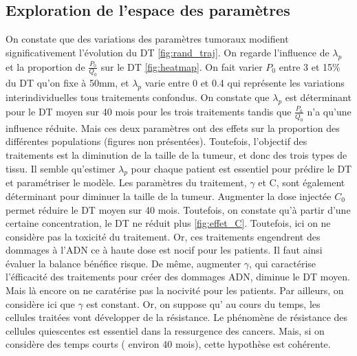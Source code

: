 \documentclass[12pt,a4paper]{article}
\begin{document}
\subsection{Exploration de l'espace des paramètres}
On constate que des variations des paramètres tumoraux modifient significativement l'évolution du DT \ref{fig:rand_traj}.  On regarde l'influence de $\lambda_{p}$ et  la proportion de $\frac{P_{0}}{Q_{0}}$
sur le DT \ref{fig:heatmap}. On fait varier $P_{0}$ entre 3 et 15\% du DT qu'on fixe à 50mm, et $\lambda_{p}$ varie entre 0 et 0.4 qui représente les variations interindividuelles tous traitements confondus. On constate que $\lambda_{p}$ est déterminant pour le DT moyen sur 40 mois pour les trois traitements tandis que $\frac{P_{0}}{Q_{0}}$ n'a qu'une influence réduite. Mais ces deux paramètres ont des effets sur la proportion des différentes populations (figures non présentées). Toutefois, l'objectif des traitements est la diminution de la taille de la tumeur, et donc des trois types de tissu. Il semble qu'estimer $\lambda_{p}$ pour chaque patient est essentiel pour prédire le DT et paramétriser le modèle. Les paramètres du traitement,  $\gamma$ et C, sont également déterminant pour diminuer la taille de la tumeur. Augmenter la dose injectée $C_{0}$ permet réduire le DT moyen sur 40 mois. Toutefois, on constate qu'à partir d'une certaine concentration, le DT ne réduit plus \ref{fig:effet_C}. Toutefois, ici on ne considère pas la toxicité du traitement.  Or, ces traitements engendrent des dommages à l'ADN ce à haute dose est nocif pour les patients. Il faut ainsi évaluer la balance bénéfice risque. De même, augmenter $\gamma$, qui caractérise l'éfficacité des traitements pour créer des dommages ADN, diminue le DT moyen. Mais là encore on ne caratérise pas la nocivité pour les patients. Par ailleurs, on considère ici que $\gamma$ est constant. Or, on suppose qu' au cours du temps, les cellules traitées vont développer de la résistance. Le phénomène de résistance des cellules quiescentes est essentiel dans la ressurgence des cancers. Mais, si on considère des temps courts ( environ 40 mois), cette hypothèse est cohérente. 
\end{document}
